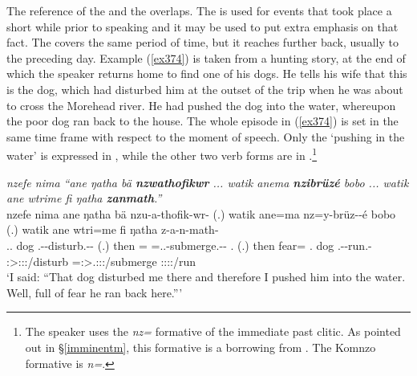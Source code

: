 The  reference of the  and the  overlaps. The  is used for events that took place a short while prior to speaking and it may be used to put extra emphasis on that fact. The  covers the same period of time, but it reaches further back, usually to the preceding day. Example (\ref{ex374}) is taken from a hunting story, at the end of which the speaker returns home to find one of his dogs. He tells his wife that this is the dog, which had disturbed him at the outset of the trip when he was about to cross the Morehead river. He had pushed the dog into the water, whereupon the poor dog ran back to the house. The whole episode in (\ref{ex374}) is set in the same time frame with respect to the moment of speech. Only the `pushing in the water' is expressed in , while the other two verb forms are in .\footnote{The speaker uses the \emph{nz=} formative of the immediate past clitic. As pointed out in \S{}\ref{imminentm}, this formative is a borrowing from . The Komnzo formative is \emph{n=}.}

\begin{exe}
	\ex \emph{nzefe nima ``ane ŋatha bä \textbf{nzwathofikwr} ... watik anema \textbf{nzibrüzé} bobo ... watik ane wtrime fi ŋatha \textbf{zanmath}.''}\\
	\glll nzefe nima ane ŋatha bä nzu-a-thofik-wr-\Zero{} (.) watik ane=ma nz=y-brüz-\Zero{}-é bobo (.) watik ane wtri=me fi ŋatha z-a-n-math-\Zero\\
	\Fsg.\Erg.\Emph{} \Quot{} \Dem{} dog \Med{} \Fsg.\Betaone-\Vc-disturb.\Ext-\Ndu-\Stsg{} (.) then \Dem=\Char{} \Immpst=\Tsg.\Masc.\Alph-submerge.\Ext-\Ndu-\Fsg{} \Med.\All{} (.) then \Dem{} fear=\Ins{} \Third.\Abs{} dog \M.\Gam-\Venit-run.\Rs{}-\Stsg\\
	{} {} {} {} {} \footnotesize{\Stsg:\Sbj>\Fsg:\Obj:\Rpst:\Ipfv/disturb} {} {} {} \footnotesize{\Immpst=\Fsg:\Sbj>\Stsg.\Masc:\Obj:\Nonpast:\Ipfv/submerge} {} {} {} {} {} {} {} \footnotesize{\Stsg:\Sbj:\Rpst:\Pfv:\Venit/run}\\
	\trans `I said: ``That dog disturbed me there and therefore I pushed him into the water. Well, full of fear he ran back here.'''
	\label{ex374}
\end{exe}

